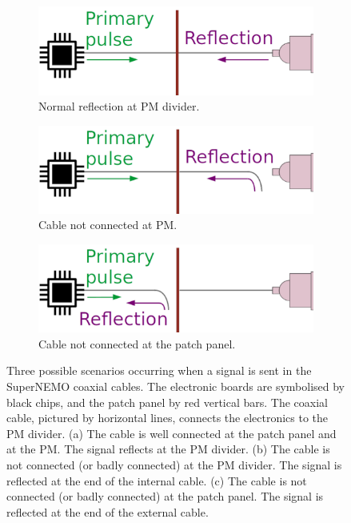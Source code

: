 \begin{figure}[h!]
  \centering
  \begin{subfigure}[b]{0.3\textwidth}
    \centering
    \includegraphics[width=1.1\textwidth]{commissioning/fig_commissioning/scheme_reflecto.pdf}
    \captionsetup{justification=centering}
    \caption{Normal reflection at PM divider.
      \label{subfig:reflecto_normal}}
  \end{subfigure}
  \hfill
  \begin{subfigure}[b]{0.3\textwidth}
    \centering
    \includegraphics[width=1.1\textwidth]{commissioning/fig_commissioning/scheme_reflecto_1.pdf}
    \captionsetup{justification=centering}
    \caption{Cable not connected at PM.
      \label{subfig:reflecto_pmt}}
  \end{subfigure}
  \hfill
  \begin{subfigure}[b]{0.3\textwidth}
    \centering
    \includegraphics[width=1.1\textwidth]{commissioning/fig_commissioning/scheme_reflecto_2.pdf}
    \captionsetup{justification=centering}
    \caption{Cable not connected at the patch panel.
      \label{subfig:reflecto_pp}}
  \end{subfigure}
  \caption{Three possible scenarios occurring when a signal is sent in the SuperNEMO coaxial cables.
    The electronic boards are symbolised by black chips, and the patch panel by red vertical bars.
    The coaxial cable, pictured by horizontal lines, connects the electronics to the PM divider.
    (a) The cable is well connected at the patch panel and at the PM. The signal reflects at the PM divider.
    (b) The cable is not connected (or badly connected) at the PM divider. The signal is reflected at the end of the internal cable.
    (c) The cable is not connected (or badly connected) at the patch panel. The signal is reflected at the end of the external cable.
    \label{fig:reflecto_scheme}}
\end{figure}

